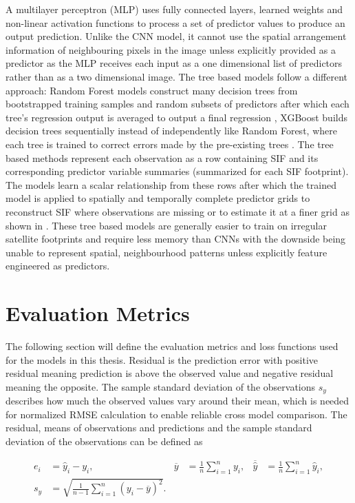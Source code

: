 A multilayer perceptron (MLP) uses fully connected layers, learned weights and non-linear activation functions to process a set of predictor values to produce an output prediction. Unlike the CNN model, it cannot use the spatial arrangement information of neighbouring pixels in the image unless explicitly provided as a predictor as the MLP receives each input as a one dimensional list of predictors rather than as a two dimensional image. The tree based models follow a different approach: Random Forest models construct many decision trees from bootstrapped training samples and random subsets of predictors after which each tree's regression output is averaged to output a final regression \cite{breiman2001random}, XGBoost builds decision trees sequentially instead of independently like Random Forest, where each tree is trained to correct errors made by the pre-existing trees \cite{chen2016xgboost}.
The tree based methods represent each observation as a row containing SIF and its corresponding predictor variable summaries (summarized for each SIF footprint). The models learn a scalar relationship from these rows after which the trained model is applied to spatially and temporally complete predictor grids to reconstruct SIF where observations are missing or to estimate it at a finer grid as shown in \cite{ma2020generation,chen2022long,he2025tracking,chen2025improved}. These tree based models are generally easier to train on irregular satellite footprints and require less memory than CNNs with the downside being unable to represent spatial, neighbourhood patterns unless explicitly feature engineered as predictors. 


\section{Evaluation Metrics \label{sec:eval_metrics}}

The following section will define the evaluation metrics and loss functions used for the models in this thesis. Residual is the prediction error with positive residual meaning prediction is above the observed value and negative residual meaning the opposite. The sample standard deviation of the observations $s_y$ describes how much the observed values vary around their mean, which is needed for normalized RMSE calculation to enable reliable cross model comparison. The residual, means of observations and predictions and the sample standard deviation of the observations can be defined as 

\begin{equation}
\begin{aligned}
e_i &= \widehat{y}_i-y_i,
&
\overline{y} &= \frac{1}{n}\sum_{i=1}^{n}y_i,
&
\overline{\widehat{y}} &= \frac{1}{n}\sum_{i=1}^{n}\widehat{y}_i,\\
s_y &= \sqrt{\frac{1}{n-1}\sum_{i=1}^{n}\left(y_i-\overline{y}\right)^2}.
\end{aligned}
\label{eq:metric_common_notation}
\end{equation}

